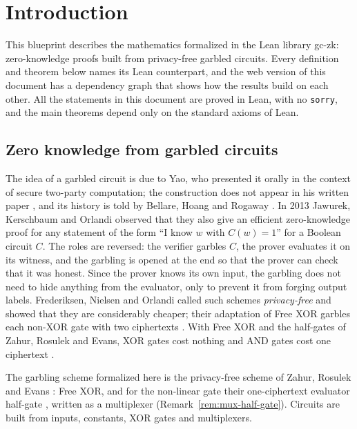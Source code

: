 \chapter{Introduction}
\label{chap:introduction}

This blueprint describes the mathematics formalized in the Lean library gc-zk: zero-knowledge
proofs built from privacy-free garbled circuits. Every definition and theorem below names its Lean
counterpart, and the web version of this document has a dependency graph that shows how the
results build on each other. All the statements in this document
are proved in Lean, with no \texttt{sorry}, and the main theorems depend only on the standard
axioms of Lean.

\section*{Zero knowledge from garbled circuits}

The idea of a garbled circuit is due to Yao, who presented it orally in the context of secure
two-party computation; the construction does not appear in his written paper \cite{Yao86}, and its
history is told by Bellare, Hoang and Rogaway \cite[Sect.~1]{BHR12b}. In 2013 Jawurek,
Kerschbaum and Orlandi \cite{JKO13} observed that they also give an efficient zero-knowledge proof
for any statement of the form ``I know $w$ with $C(w) = 1$'' for a Boolean circuit $C$. The roles
are reversed: the verifier garbles $C$, the prover evaluates it on its witness, and the garbling
is opened at the end so that the prover can check that it was honest. Since the prover knows its
own input, the garbling does not need to hide anything from the evaluator, only to prevent it
from forging output labels. Frederiksen, Nielsen and Orlandi called such schemes
\emph{privacy-free} \cite[Sect.~2.2, Definition~4]{FNO15} and showed that they are considerably
cheaper; their adaptation of Free XOR garbles each non-XOR gate with two ciphertexts
\cite[Sect.~1.2]{FNO15}. With Free XOR \cite{KS08} and
the half-gates of Zahur, Rosulek and Evans, XOR gates cost nothing and AND gates cost one
ciphertext \cite[Sect.~6]{ZRE15}.

The garbling scheme formalized here is the privacy-free scheme of Zahur, Rosulek and Evans
\cite[Sect.~6]{ZRE15}: Free XOR, and for the non-linear gate their one-ciphertext evaluator
half-gate \cite[Sect.~3.1]{ZRE15}, written as a multiplexer (Remark~\ref{rem:mux-half-gate}).
Circuits are built from inputs, constants, XOR gates and multiplexers.

